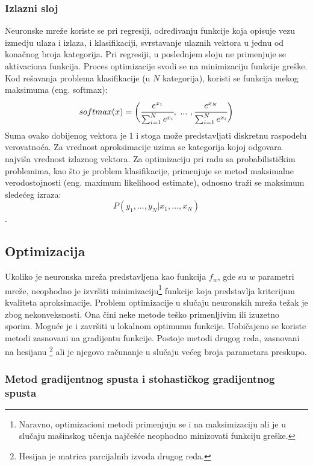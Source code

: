 \subsubsection{Izlazni sloj}

Neuronske mreže koriste se pri regresiji, određivanju funkcije koja opisuje vezu izmedju ulaza i izlaza, i klasifikaciji, svrstavanje ulaznih vektora u jednu od konačnog broja kategorija. Pri regresiji, u poslednjem sloju ne primenjuje se aktivaciona funkcija. Proces optimizacije svodi se na minimizaciju funkcije greške. Kod rešavanja problema klasifikacije (u $N$ kategorija), koristi se funkcija mekog maksimuma (eng. softmax):
\begin{equation}
	softmax(x) = \bigg( \cfrac{e^{x_1}}{\sum_{i=1}^{N} e^{x_i}}, ~...~, \cfrac{e^{x_N}}{\sum_{i=1}^{N} e^{x_i}} \bigg)
\end{equation}
Suma ovako dobijenog vektora je $1$ i stoga može predstavljati diskretnu raspodelu verovatnoća. Za vrednost aproksimacije uzima se kategorija kojoj odgovara najviša vrednost izlaznog vektora. Za optimizaciju pri radu sa probabilističkim problemima, kao što je problem klasifikacije, primenjuje se metod maksimalne verodostojnosti (eng. maximum likelihood estimate), odnosno traži se maksimum sledećeg izraza: 
\begin{equation}
	P(y_1, ..., y_N | x_1, ..., x_N)
\end{equation}.

\subsection{Optimizacija}
\label{subsec:optimizacija}

Ukoliko je neuronska mreža predstavljena kao funkcija $f_w$, gde su $w$ parametri mreže, neophodno je izvršiti minimizaciju\footnote{Naravno, optimizacioni metodi primenjuju se i na maksimizaciju ali je u slučaju mašinskog učenja najčešće neophodno minizovati funkciju greške.} funkcije koja predstavlja kriterijum kvaliteta aproksimacije. Problem optimizacije u slučaju neuronskih mreža težak je zbog nekonveksnosti. Ona čini neke metode teško primenljivim ili izuzetno sporim. Moguće je i završiti u lokalnom optimumu funkcije. Uobičajeno se koriste metodi zasnovani na gradijentu funkcije. Postoje metodi drugog reda, zasnovani na hesijanu \footnote{Hesijan je matrica parcijalnih izvoda drugog reda.} ali je njegovo računanje u slučaju većeg broja parametara preskupo.

\subsubsection{Metod gradijentnog spusta i stohastičkog gradijentnog spusta}


